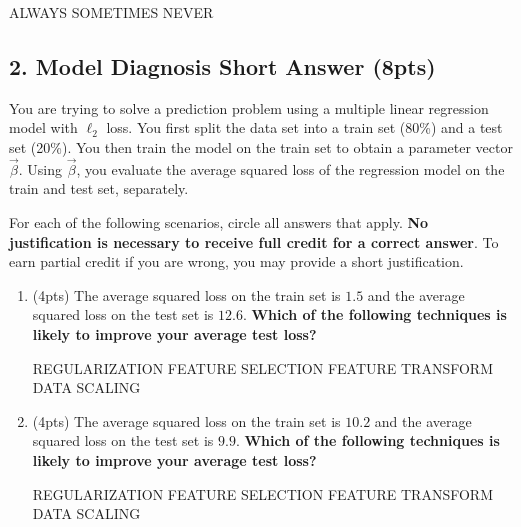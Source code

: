 \documentclass[10pt]{article}
\begin{document}
\begin{enumerate}[label=(\alph*)]
	ALWAYS\hspace{1em} SOMETIMES\hspace{1em} NEVER\vspace{4.5em}
	

\end{enumerate}

\subsection{2. Model Diagnosis Short Answer (\textbf{\small 8pts})}
You are trying to solve a prediction problem using a multiple linear regression model with $\ell_2$ loss. 
You first split the data set into a train set (80\%) and a test set (20\%). You then train the model on the train set to obtain a parameter vector $\vec{\beta}$. Using $\vec{\beta}$, you evaluate the average squared loss of the regression model on the train and test set, separately.


For each of the following scenarios, circle all answers that apply.  \textbf{No justification is necessary to receive full credit for a correct answer}. To earn partial credit if you are wrong, you may provide a short justification.
\begin{enumerate}[label=(\alph*)]
	\item  (4pts) The average squared loss on the train set is $1.5$ and the average squared loss on the test set is $12.6$. \textbf{Which of the following techniques is likely to improve your average test loss?} 
	
	\vspace{1em}REGULARIZATION\hspace{1em} FEATURE SELECTION\hspace{1em} FEATURE TRANSFORM \hspace{1em} DATA SCALING\vspace{8em}

	
	\item (4pts) The average squared loss on the train set is $10.2$ and the average squared loss on the test set is $9.9$. \textbf{Which of the following techniques is likely to improve your average test loss?}
	
	\vspace{1em}REGULARIZATION\hspace{1em} FEATURE SELECTION\hspace{1em} FEATURE TRANSFORM \hspace{1em} DATA SCALING\vspace{8em}
	
	

\end{enumerate}
\end{document}
